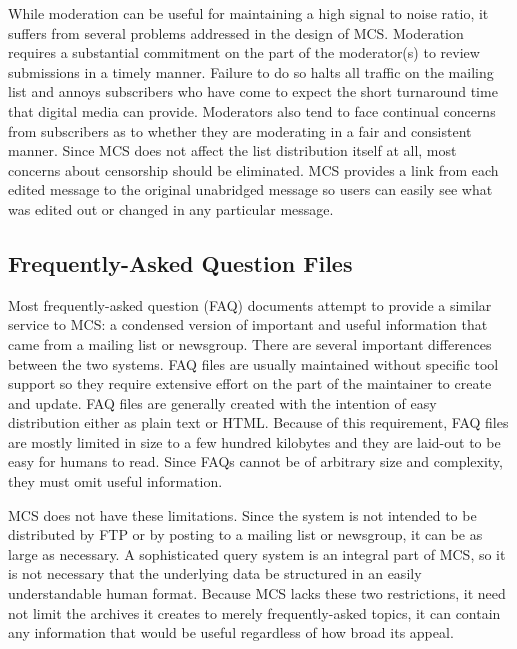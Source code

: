 While moderation can be useful for maintaining a high signal to noise ratio, it
suffers from several problems addressed in the design of MCS. Moderation
requires a substantial commitment on the part of the moderator(s) to review
submissions in a timely manner. Failure to do so halts all traffic on the
mailing list and annoys subscribers who have come to expect the short
turnaround time that digital media can provide. Moderators also tend to face
continual concerns from subscribers as to whether they are moderating in a fair
and consistent manner. Since MCS does not affect the list distribution itself
at all, most concerns about censorship should be eliminated. MCS provides a
link from each edited message to the original unabridged message so users can
easily see what was edited out or changed in any particular message.

\subsection{Frequently-Asked Question Files}
Most frequently-asked question (FAQ) documents attempt to provide a similar
service to MCS: a condensed version of important and useful information that
came from a mailing list or newsgroup. There are several important differences
between the two systems. FAQ files are usually maintained without specific tool
support so they require extensive effort on the part of the maintainer to
create and update. FAQ files are generally created with the intention of easy
distribution either as plain text or HTML. Because of this requirement, FAQ
files are mostly limited in size to a few hundred kilobytes and they are
laid-out to be easy for humans to read. Since FAQs cannot be of arbitrary size
and complexity, they must omit useful information.

MCS does not have these limitations. Since the system is not intended to be
distributed by FTP or by posting to a mailing list or newsgroup, it can be as
large as necessary. A sophisticated query system is an integral part of MCS, so
it is not necessary that the underlying data be structured in an easily
understandable human format. Because MCS lacks these two restrictions, it need
not limit the archives it creates to merely frequently-asked topics, it can
contain any information that would be useful regardless of how broad its
appeal.

